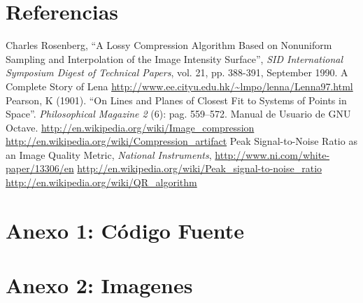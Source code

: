 \documentclass[twocolumn,a4paper,10pt]{article}
\begin{document}
\section*{Referencias}
\begin{thebibliography}{99}
    
    Charles Rosenberg, ``A Lossy Compression Algorithm Based on Nonuniform Sampling and Interpolation of the Image Intensity Surface'', 
    \textit{SID International Symposium Digest of Technical Papers}, vol. 21, pp. 388-391, September 1990.
    A Complete Story of Lena \url{http://www.ee.cityu.edu.hk/~lmpo/lenna/Lenna97.html}
     Pearson, K (1901). ``On Lines and Planes of Closest Fit to Systems of Points in Space''. \textit{Philosophical Magazine 2} (6): pag. 559–572.
     Manual de Usuario de GNU Octave.
     \url{http://en.wikipedia.org/wiki/Image\_compression}
     \url{http://en.wikipedia.org/wiki/Compression\_artifact}
     Peak Signal-to-Noise Ratio as an Image Quality Metric, \textit{National Instruments}, \url{http://www.ni.com/white-paper/13306/en}
     \url{http://en.wikipedia.org/wiki/Peak_signal-to-noise_ratio}
     \url{http://en.wikipedia.org/wiki/QR_algorithm}

\end{thebibliography}

\newpage
\paragraph*{}
\newpage
\section*{Anexo 1: Código Fuente}
    
    
    
    

\newpage
\section*{Anexo 2: Imagenes}
\end{document}

